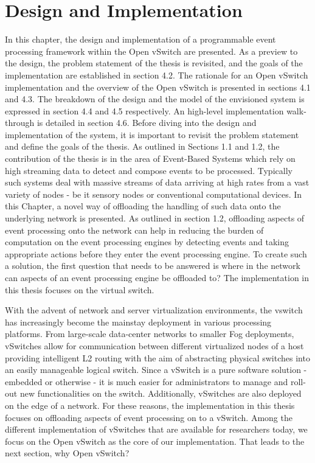 \chapter{Design and Implementation}
In this chapter, the design and implementation of a programmable event processing framework within the Open vSwitch are presented. As a preview to the design, the problem statement of the thesis is revisited, and the goals of the implementation are established in section 4.2. The rationale for an Open vSwitch implementation and the overview of the Open vSwitch is presented in sections 4.1 and 4.3. The breakdown of the design and the model of the envisioned system is expressed in section 4.4 and 4.5 respectively. An high-level implementation walk-through is detailed in section 4.6.
Before diving into the design and implementation of the system, it is important to revisit the problem statement and define the goals of the thesis. As outlined in Sections 1.1 and 1.2, the contribution of the thesis is in the area of Event-Based Systems which rely on high streaming data to detect and compose events to be processed. Typically such systems deal with massive streams of data arriving at high rates from a vast variety of nodes - be it sensory nodes or conventional computational devices. In this Chapter, a novel way of offloading the handling of such data onto the underlying network is presented. As outlined in section 1.2, offloading aspects of event processing onto the network can help in reducing the burden of computation on the event processing engines by detecting events and taking appropriate actions before they enter the event processing engine. To create such a solution, the first question that needs to be answered is where in the network can aspects of an event processing engine be offloaded to? The implementation in this thesis focuses on the virtual switch.

With the advent of network and server virtualization environments, the \ac{vswitch} has increasingly become the mainstay deployment in  various processing platforms. From large-scale data-center networks to smaller Fog deployments, vSwitches allow for communication between different virtualized nodes of a host providing intelligent L2 routing with the aim of abstracting physical switches into an easily manageable logical switch. Since a vSwitch is a pure software solution - embedded or otherwise - it is much easier for administrators to manage and roll-out new functionalities on the switch. Additionally, vSwitches are also deployed on the edge of a network. For these reasons, the implementation in this thesis focuses on offloading aspects of event processing on to a vSwitch. Among the different implementation of vSwitches that are available for researchers today, we focus on the Open vSwitch as the core of our implementation. That leads to the next section, why Open vSwitch? 



